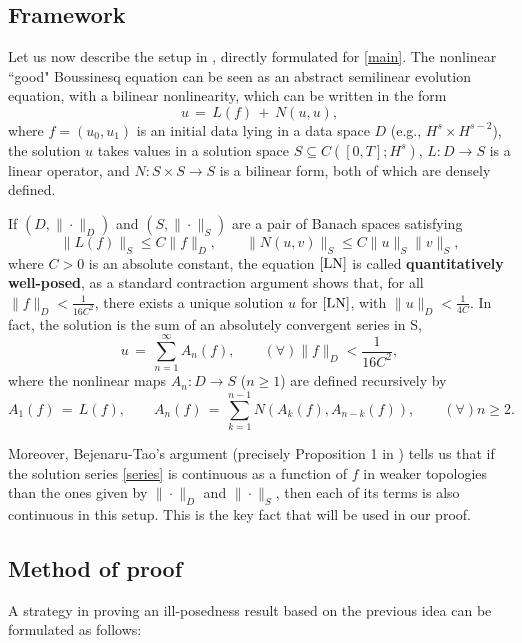 \documentclass{amsart}
\begin{document}
\subsection{Framework} Let us now describe the setup in \cite{BT06}, directly formulated for \eqref{main}. The nonlinear ``good" Boussinesq equation can be seen as an abstract semilinear evolution equation, with a bilinear nonlinearity, which can be written in the form 
\begin{equation}
u\,=\,L(f)\,+\,N(u,u),
\label{LN}
\end{equation}
where $f=(u_0, u_1)$ is an initial data lying in a data space $D$ (e.g., $H^s \times H^{s-2}$), the solution $u$ takes values in a solution space $S \subseteq	 C([0,T]; H^s)$, $L: D \to S$ is a linear operator, and $N:S\times S \to S$ is a bilinear form, both of which are densely defined.  

If  $(D,\|\cdot \|_D)$ and $(S,\|\cdot \|_S)$ are a pair of Banach spaces satisfying 
\begin{equation}
\|L(f)\|_S \leq C \|f\|_D,\qquad \|N(u,v)\|_S \leq C \|u\|_S \|v\|_S,
\label{estim}
\end{equation}
where $C>0$ is an absolute constant, the equation $\eqref{LN}$ is called \textbf{quantitatively well-posed}, as a standard contraction argument shows that, for all  $\|f\|_D<\frac{1}{16C^2}$, there exists a unique solution $u$ for $\eqref{LN}$, with $\|u\|_D<\frac{1}{4C}$. In fact, the solution is the sum of an absolutely convergent series in S, 
\begin{equation}
u\,=\,\sum_{n=1}^{\infty} A_n(f), \qquad (\forall) \|f\|_D<\frac{1}{16C^2},
\label{series}
\end{equation}
where the nonlinear maps $A_n: D\to S$ ($n\geq 1$) are defined recursively by
\begin{equation}
A_1(f)\,=\,L(f), \qquad A_n(f)\,=\,\sum_{k=1}^{n-1} N(A_k(f),A_{n-k}(f)), \qquad (\forall)n\geq 2.
\label{An}
\end{equation}



Moreover, Bejenaru-Tao's argument (precisely Proposition 1 in \cite{BT06}) tells us that if the solution series \eqref{series} is continuous as a function of $f$ in  weaker topologies than the ones given by $\| \cdot\|_D$ and $\| \cdot \|_S$, then each of its terms is also continuous in this setup. This is the key fact  that will be used in our proof.

\subsection{Method of proof} A strategy in proving an ill-posedness result based on the previous idea can be formulated as follows:
\end{document}

